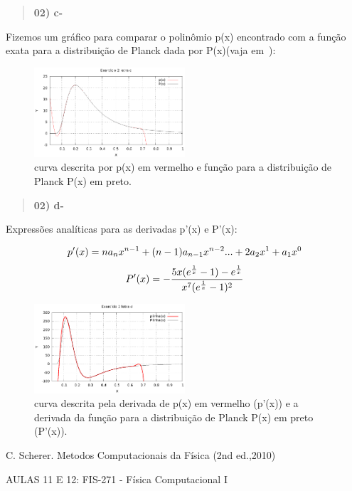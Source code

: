 \documentclass[a4wide]{report}
\begin{document}
\begin{quote}

\bf 02) c- 

\end{quote}

Fizemos um gráfico para comparar o polinômio p(x) encontrado com a função exata para a distribuição de Planck
dada por P(x)(vaja em~\cite{roteiro}):

\begin{figure}[h]
\centering
\includegraphics[width=0.5\textwidth]{ex02c}
\caption{curva descrita por p(x) em vermelho e função para a distribuição de Planck P(x) em preto.}
\label{ex02b1.2}
\end{figure}

\begin{quote}

\bf 02) d- 

\end{quote}

Expressões analíticas para as derivadas p'(x) e P'(x):

\begin{equation}
\centering
p'(x) = na_{n}x^{n-1} + (n - 1)a_{n-1}x^{n-2} ...  + 2a_{2}x^{1} + a_{1}x^{0}      
\label{plinha(x)1.1}
\end{equation}
\begin{equation}
\centering
P'(x)= - \frac{5x(e^{\frac{1}{x}} - 1) - e^{\frac{1}{x}} }{x^{7}(e^{\frac{1}{x}}-1)^{2}}
\label{Plinha(x)1.2}
\end{equation}

\begin{figure}[h]
\centering
\includegraphics[width=0.5\textwidth]{ex02d}
\caption{curva descrita pela derivada de p(x) em vermelho (p'(x)) e a derivada da função para a distribuição de Planck P(x) em preto (P'(x)).}
\label{ex02d1.1}
\end{figure}

\begin{thebibliography}{99}

 C. Scherer. Metodos Computacionais da Física (2nd ed.,2010)

 AULAS 11 E 12: FIS-271 - Física Computacional I

\end{thebibliography}
\end{document}
